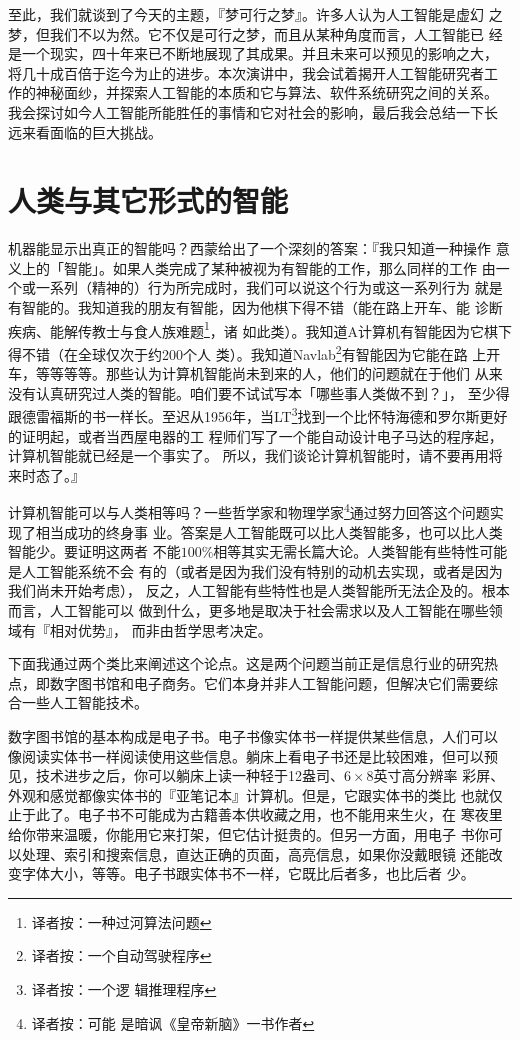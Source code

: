 \documentclass[12pt,a4paper]{article}
\begin{document}
至此，我们就谈到了今天的主题，『梦可行之梦』。许多人认为人工智能是虚幻
之梦，但我们不以为然。它不仅是可行之梦，而且从某种角度而言，人工智能已
经是一个现实，四十年来已不断地展现了其成果。并且未来可以预见的影响之大，
将几十成百倍于迄今为止的进步。本次演讲中，我会试着揭开人工智能研究者工
作的神秘面纱，并探索人工智能的本质和它与算法、软件系统研究之间的关系。
我会探讨如今人工智能所能胜任的事情和它对社会的影响，最后我会总结一下长
远来看面临的巨大挑战。

\section{人类与其它形式的智能}

机器能显示出真正的智能吗？西蒙给出了一个深刻的答案：『我只知道一种操作
意义上的「智能」。如果人类完成了某种被视为有智能的工作，那么同样的工作
由一个或一系列（精神的）行为所完成时，我们可以说这个行为或这一系列行为
就是有智能的。我知道我的朋友有智能，因为他棋下得不错（能在路上开车、能
诊断疾病、能解传教士与食人族难题\footnote{译者按：一种过河算法问题}，诸
如此类）。我知道A计算机有智能因为它棋下得不错（在全球仅次于约200个人
类）。我知道Navlab\footnote{译者按：一个自动驾驶程序}有智能因为它能在路
上开车，等等等等。那些认为计算机智能尚未到来的人，他们的问题就在于他们
从来没有认真研究过人类的智能。咱们要不试试写本「哪些事人类做不到？」，
至少得跟德雷福斯的书一样长。至迟从1956年，当LT\footnote{译者按：一个逻
  辑推理程序}找到一个比怀特海德和罗尔斯更好的证明起，或者当西屋电器的工
程师们写了一个能自动设计电子马达的程序起，计算机智能就已经是一个事实了。
所以，我们谈论计算机智能时，请不要再用将来时态了。』

计算机智能可以与人类相等吗？一些哲学家和物理学家\footnote{译者按：可能
  是暗讽《皇帝新脑》一书作者}通过努力回答这个问题实现了相当成功的终身事
业。答案是人工智能既可以比人类智能多，也可以比人类智能少。要证明这两者
不能$100\%$相等其实无需长篇大论。人类智能有些特性可能是人工智能系统不会
有的（或者是因为我们没有特别的动机去实现，或者是因为我们尚未开始考虑），
反之，人工智能有些特性也是人类智能所无法企及的。根本而言，人工智能可以
做到什么，更多地是取决于社会需求以及人工智能在哪些领域有『相对优势』，
而非由哲学思考决定。

下面我通过两个类比来阐述这个论点。这是两个问题当前正是信息行业的研究热
点，即数字图书馆和电子商务。它们本身并非人工智能问题，但解决它们需要综
合一些人工智能技术。

数字图书馆的基本构成是电子书。电子书像实体书一样提供某些信息，人们可以
像阅读实体书一样阅读使用这些信息。躺床上看电子书还是比较困难，但可以预
见，技术进步之后，你可以躺床上读一种轻于12盎司、$6\times8$英寸高分辨率
彩屏、外观和感觉都像实体书的『亚笔记本』计算机。但是，它跟实体书的类比
也就仅止于此了。电子书不可能成为古籍善本供收藏之用，也不能用来生火，在
寒夜里给你带来温暖，你能用它来打架，但它估计挺贵的。但另一方面，用电子
书你可以处理、索引和搜索信息，直达正确的页面，高亮信息，如果你没戴眼镜
还能改变字体大小，等等。电子书跟实体书不一样，它既比后者多，也比后者
少。
\end{document}
